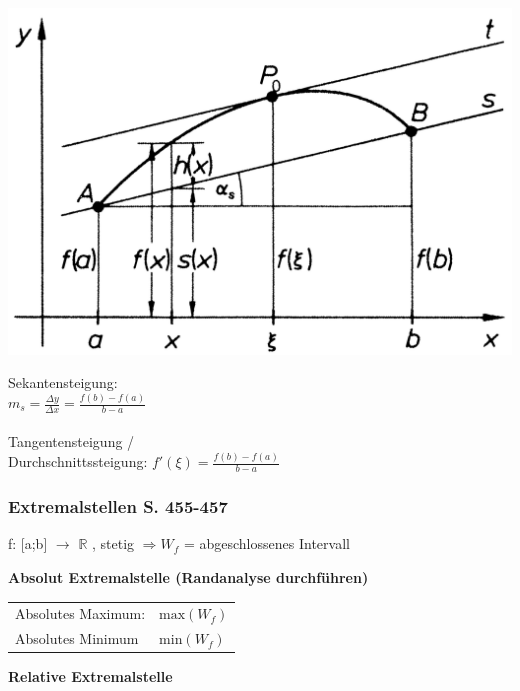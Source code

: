 			\begin{minipage}[b]{.5\linewidth} 
  			\includegraphics[width=\linewidth]{Bilder/mittelwertsatz}
			\end{minipage}
			\hfill
			\begin{minipage}[b]{.45\linewidth} 
  			
  			Sekantensteigung: \\
  			$m_s = \frac{\Delta y}{\Delta x} = \frac{f(b) - f(a)}{b - a}$ \\
  			\\
  			
  			Tangentensteigung / \\
  			Durchschnittssteigung:
  			$f'(\xi) = \frac{f(b) - f(a)}{b - a}$ \\		
				
			\end{minipage}			
		
			
			\subsubsection{Extremalstellen S. 455-457}
			f: [a;b] $\rightarrow$ $\mathbb{R}$ , stetig $\Rightarrow W_f$ = abgeschlossenes Intervall 
			
			\textbf{Absolut Extremalstelle (Randanalyse durchführen)}\\
			\begin{tabular}{ll}
			Absolutes Maximum: &  $\mathrm{max}(W_f)$\\
		  	Absolutes Minimum & $\mathrm{min}(W_f)$ \\
			\end{tabular}
			
			\textbf{Relative Extremalstelle}\\
		
